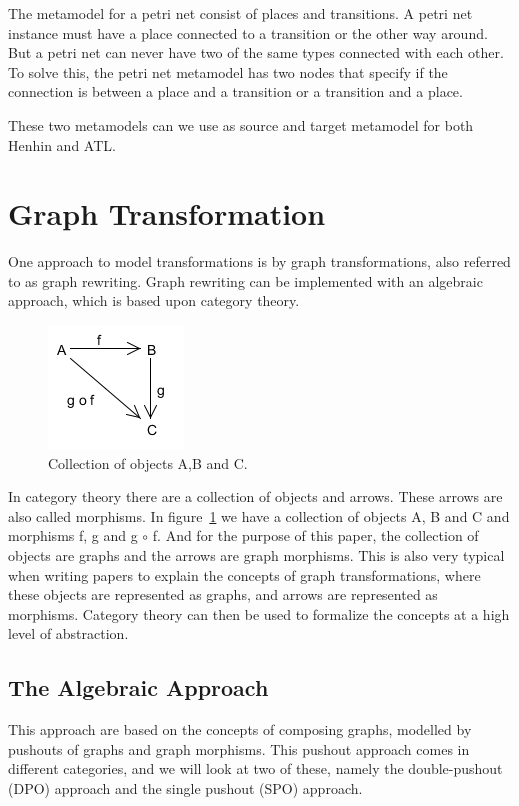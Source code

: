 \documentclass[pdftex,11pt,a4paper]{article}
\begin{document}
The metamodel for a petri net consist of places and transitions. A petri net
instance must have a place connected to a transition or the other way around.
But a petri net can never have two of the same types connected with each other.
To solve this, the petri net metamodel has two nodes that specify if the
connection is between a place and a transition or a transition and a place.

These two metamodels can we use as source and target metamodel for
both Henhin and ATL. 

\section{Graph Transformation}
\noindent One approach to model transformations is by graph transformations,
also referred to as graph rewriting. Graph rewriting can be implemented with
an algebraic approach, which is based upon category theory\cite{Barr1990}.

\begin{figure}[H]
	\centering
	\includegraphics[scale=0.7]{figures/categoryTheory.png}
	\caption{Collection of objects A,B and C.}
	\label{fig:categoryTheory}
\end{figure}


In category theory there are a collection of objects and arrows. These arrows
are also called morphisms. In figure~\ref{fig:categoryTheory} we have a
collection of objects A, B and C and morphisms f, g and g $\circ$ f. And for the
purpose of this paper, the collection of objects are graphs and the arrows are
graph morphisms. This is also very typical when writing papers to explain the
concepts of graph transformations, where these objects are represented as
graphs, and arrows are represented as morphisms. Category theory can then be
used to formalize the concepts at a high level of abstraction.

\subsection{The Algebraic Approach}
\noindent This approach are based on the concepts of composing graphs, modelled
by pushouts of graphs and graph morphisms. This pushout approach comes in
different categories, and we will look at two of these, namely the
double-pushout (DPO) approach and the single pushout (SPO) approach\cite{Loewe1997,Ehrig1997}.
\end{document}
